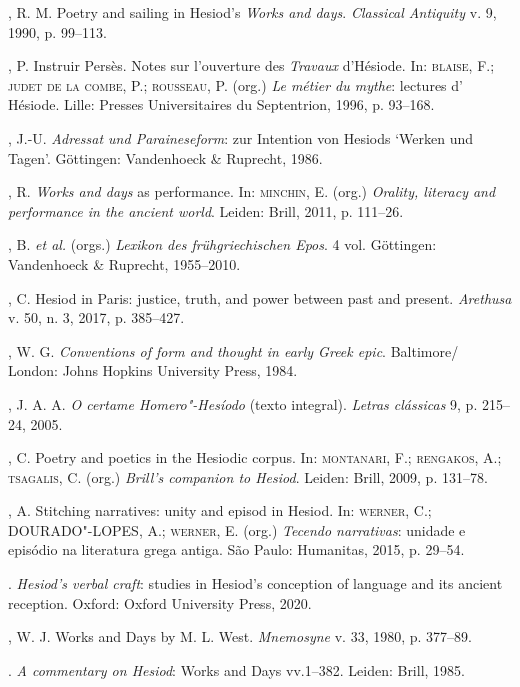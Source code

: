 \begin{bibliohedra}
, R. M. Poetry and sailing in Hesiod's \emph{Works and days}.
\emph{Classical Antiquity} v. 9, 1990, p. 99--113.

, P. Instruir Persès. Notes sur l'ouverture des \emph{Travaux}
d'Hésiode. In: \textsc{blaise}, F.; \textsc{judet de la combe}, P.; \textsc{rousseau}, P. (org.)
\emph{Le métier du mythe}: lectures d' Hésiode. Lille: Presses
Universitaires du Septentrion, 1996, p. 93--168.

, J.-U. \emph{Adressat und Paraineseform}: zur Intention von
Hesiods `Werken und Tagen'. Göttingen: Vandenhoeck \& Ruprecht, 1986.

, R. \emph{Works and days} as performance. In: \textsc{minchin}, E. (org.)
\emph{Orality, literacy and performance in the ancient world}. Leiden:
Brill, 2011, p. 111--26.

, B. \emph{et al.} (orgs.) \emph{Lexikon des frühgriechischen
Epos}. 4 vol. Göttingen: Vandenhoeck \& Ruprecht, 1955--2010.

, C. Hesiod in Paris: justice, truth, and power between past and
present. \emph{Arethusa} v. 50, n. 3, 2017, p. 385--427.

, W. G. \emph{Conventions of form and thought in early Greek
epic}. Baltimore/ London: Johns Hopkins University Press, 1984.

, J. A. A. \emph{O certame Homero"-Hesíodo} (texto integral).
\emph{Letras clássicas} 9, p. 215--24, 2005.

, C. Poetry and poetics in the Hesiodic corpus. In: \textsc{montanari},
F.; \textsc{rengakos}, A.; \textsc{tsagalis}, C. (org.) \emph{Brill's companion to
Hesiod}. Leiden: Brill, 2009, p. 131--78.

, A. Stitching narratives: unity and episod in Hesiod. In:
\textsc{werner}, C.; \textsc{DOURADO"-LOPES}, A.; \textsc{werner}, E. (org.) \emph{Tecendo
narrativas}: unidade e episódio na literatura grega antiga. São Paulo:
Humanitas, 2015, p. 29--54.

\titidem. \emph{Hesiod's verbal craft}: studies in Hesiod's conception of
language and its ancient reception. Oxford: Oxford University Press,
2020.

, W. J. Works and Days by M. L. West. \emph{Mnemosyne} v. 33,
1980, p. 377--89.

\titidem. \emph{A commentary on Hesiod}: Works and Days vv.1--382. Leiden:
Brill, 1985.


\end{bibliohedra}
